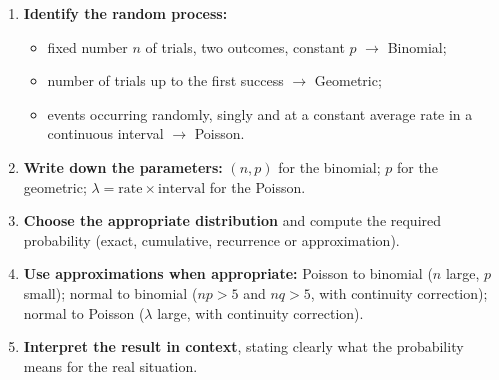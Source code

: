 \documentclass[11pt]{article}
\begin{document}
\begin{methode}
\begin{enumerate}
\item \textbf{Identify the random process:}
\begin{itemize}
\item fixed number $n$ of trials, two outcomes, constant $p$ $\rightarrow$ Binomial;
\item number of trials up to the first success $\rightarrow$ Geometric;
\item events occurring randomly, singly and at a constant average rate in a continuous interval $\rightarrow$ Poisson.
\end{itemize}
\item \textbf{Write down the parameters:} $(n,p)$ for the binomial; $p$ for the geometric; $\lambda = \text{rate} \times \text{interval}$ for the Poisson.
\item \textbf{Choose the appropriate distribution} and compute the required probability (exact, cumulative, recurrence or approximation).
\item \textbf{Use approximations when appropriate:} Poisson to binomial ($n$ large, $p$ small); normal to binomial ($np > 5$ and $nq > 5$, with continuity correction); normal to Poisson ($\lambda$ large, with continuity correction).
\item \textbf{Interpret the result in context}, stating clearly what the probability means for the real situation.
\end{enumerate}
\end{methode}
\end{document}
